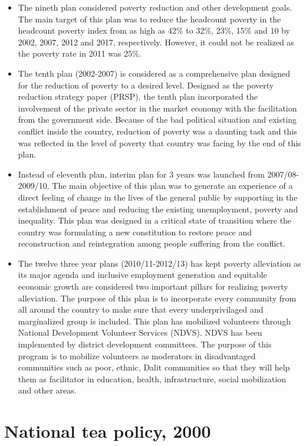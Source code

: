 \documentclass[
]{book}
\providecommand{\tightlist}{%
  \setlength{\itemsep}{0pt}\setlength{\parskip}{0pt}}
\begin{document}
\begin{itemize}
\tightlist
\item
  The nineth plan considered poverty reduction and other development goals. The main target of this plan was to reduce the headcount poverty in the headcount poverty index from as high as 42\% to 32\%, 23\%, 15\% and 10 by 2002, 2007, 2012 and 2017, respectively. However, it could not be realized as the poverty rate in 2011 was 25\%.
\item
  The tenth plan (2002-2007) is considered as a comprehensive plan designed for the reduction of poverty to a desired level. Designed as the poverty reduction strategy paper (PRSP), the tenth plan incorporated the involvement of the private sector in the market economy with the facilitation from the government side. Because of the bad political situation and existing conflict inside the country, reduction of poverty was a daunting task and this was reflected in the level of poverty that country was facing by the end of this plan.
\item
  Instead of eleventh plan, interim plan for 3 years was launched from 2007/08-2009/10. The main objective of this plan was to generate an experience of a direct feeling of change in the lives of the general public by supporting in the establishment of peace and reducing the existing unemployment, poverty and inequality. This plan was designed in a critical state of transition where the country was formulating a new constitution to restore peace and reconstruction and reintegration among people suffering from the conflict.
\item
  The twelve three year plans (2010/11-2012/13) has kept poverty alleviation as its major agenda and inclusive employment generation and equitable economic growth are considered two important pillars for realizing poverty alleviation. The purpose of this plan is to incorporate every community from all around the country to make sure that every underprivilaged and marginalized group is included. This plan has mobilized volunteers through National Development Volunteer Services (NDVS). NDVS has been implemented by district development committees. The purpose of this program is to mobilize volunteers as moderators in disadvantaged communities such as poor, ethnic, Dalit communities so that they will help them as facilitator in education, health, infrastructure, social mobilization and other areas.
\end{itemize}

\hypertarget{national-tea-policy-2000}{%
\section{National tea policy, 2000}\label{national-tea-policy-2000}}
\end{document}
